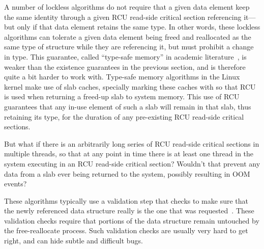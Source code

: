 A number of lockless algorithms do not require that a given data
element keep the same identity through a given RCU read-side critical
section referencing it---but only if that data element retains the
same type.
In other words, these lockless algorithms can tolerate a given data
element being freed and reallocated as the same type of structure
while they are referencing it, but must prohibit a change in type.
This guarantee, called ``type-safe memory'' in
academic literature~\cite{Cheriton96a},
is weaker than the existence guarantees in the
previous section, and is therefore quite a bit harder to work with.
Type-safe memory algorithms in the Linux kernel make use of slab caches,
specially marking these caches with 
so that RCU is used when returning a freed-up
slab to system memory.
This use of RCU guarantees that any in-use element of
such a slab will remain in that slab, thus retaining its type,
for the duration of any pre-existing RCU read-side critical sections.

\QuickQuiz{}
	But what if there is an arbitrarily long series of RCU
	read-side critical sections in multiple threads, so that at
	any point in time there is at least one thread in the system
	executing in an RCU read-side critical section?
	Wouldn't that prevent any data from a 
	slab ever being returned to the system, possibly resulting
	in OOM events?
 \QuickQuizEnd

These algorithms typically use a validation step that checks to make
sure that the newly referenced data structure really is the one that
was requested~\cite[Section 2.5]{LaninShasha1986TSM}.
These validation checks require that portions of the data structure
remain untouched by the free-reallocate process.
Such validation checks are usually very hard to get right, and can
hide subtle and difficult bugs.

